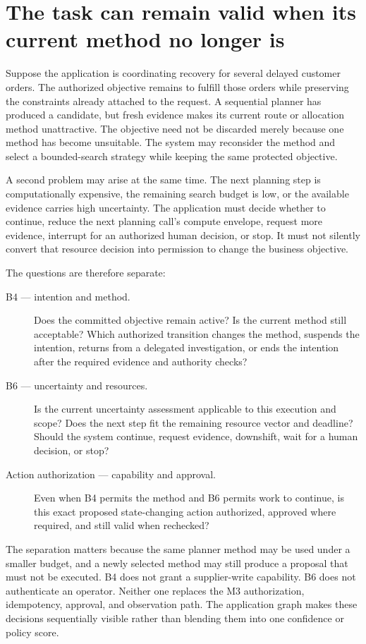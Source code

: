 \section{The task can remain valid when its current method no longer is}
\label{sec:ch23-valid-task-method-change}

\BookExampleLabel{} Suppose the application is coordinating recovery for several delayed customer orders. The authorized objective remains to fulfill those orders while preserving the constraints already attached to the request. A sequential planner has produced a candidate, but fresh evidence makes its current route or allocation method unattractive. The objective need not be discarded merely because one method has become unsuitable. The system may reconsider the method and select a bounded-search strategy while keeping the same protected objective.

A second problem may arise at the same time. The next planning step is computationally expensive, the remaining search budget is low, or the available evidence carries high uncertainty. The application must decide whether to continue, reduce the next planning call's compute envelope, request more evidence, interrupt for an authorized human decision, or stop. It must not silently convert that resource decision into permission to change the business objective.

The questions are therefore separate:

\begin{description}
  \item[B4 — intention and method.] Does the committed objective remain active? Is the current method still acceptable? Which authorized transition changes the method, suspends the intention, returns from a delegated investigation, or ends the intention after the required evidence and authority checks?
  \item[B6 — uncertainty and resources.] Is the current uncertainty assessment applicable to this execution and scope? Does the next step fit the remaining resource vector and deadline? Should the system continue, request evidence, downshift, wait for a human decision, or stop?
  \item[Action authorization — capability and approval.] Even when B4 permits the method and B6 permits work to continue, is this exact proposed state-changing action authorized, approved where required, and still valid when rechecked?
\end{description}

The separation matters because the same planner method may be used under a smaller budget, and a newly selected method may still produce a proposal that must not be executed. B4 does not grant a supplier-write capability. B6 does not authenticate an operator. Neither one replaces the M3 authorization, idempotency, approval, and observation path. The application graph makes these decisions sequentially visible rather than blending them into one confidence or policy score.

